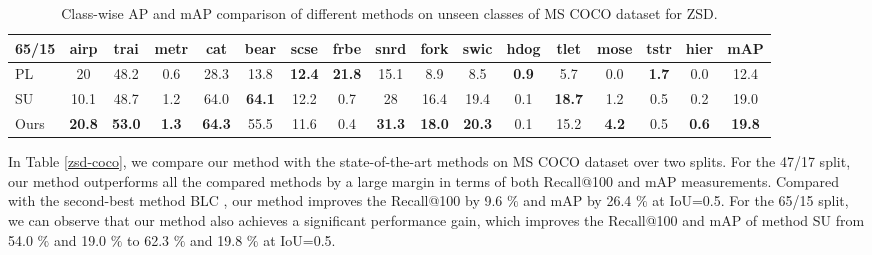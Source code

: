 \documentclass[10pt,twocolumn,letterpaper]{article}
\begin{document}
\begin{table*}[t]
  \centering

  \caption{Class-wise AP and mAP comparison of different methods on unseen classes of MS COCO dataset for ZSD.}
\renewcommand\tabcolsep{5.2pt}
    \begin{tabular}{lcccccccccccccccc}
    \toprule
    65/15 & \multicolumn{1}{c}{airp} & \multicolumn{1}{c}{trai} & \multicolumn{1}{c}{metr} & \multicolumn{1}{c}{cat} & \multicolumn{1}{c}{bear} & \multicolumn{1}{c}{scse} & \multicolumn{1}{c}{frbe} & \multicolumn{1}{c}{snrd} & \multicolumn{1}{c}{fork} & \multicolumn{1}{c}{swic} & \multicolumn{1}{c}{hdog} & \multicolumn{1}{c}{tlet} & \multicolumn{1}{c}{mose} & \multicolumn{1}{c}{tstr} & \multicolumn{1}{c}{hier} & \multicolumn{1}{c}{mAP} \\
    \midrule
    PL \cite{rahman2020improved}   & \multicolumn{1}{c}{20} & \multicolumn{1}{c}{48.2} & \multicolumn{1}{c}{0.6} & \multicolumn{1}{c}{28.3} & \multicolumn{1}{c}{13.8} & \multicolumn{1}{c}{\textbf{12.4}} & \multicolumn{1}{c}{\textbf{21.8}} & \multicolumn{1}{c}{15.1} & \multicolumn{1}{c}{8.9} & \multicolumn{1}{c}{8.5} & \multicolumn{1}{c}{\textbf{0.9}} & \multicolumn{1}{c}{5.7} & \multicolumn{1}{c}{0.0} & \multicolumn{1}{c}{\textbf{1.7}} & \multicolumn{1}{c}{0.0} & \multicolumn{1}{c}{12.4} \\
    SU  \cite{hayat2020synthesizing}  & \multicolumn{1}{c}{10.1} & \multicolumn{1}{c}{48.7} & \multicolumn{1}{c}{1.2} & \multicolumn{1}{c}{64.0} & \multicolumn{1}{c}{\textbf{64.1}} & \multicolumn{1}{c}{12.2} & \multicolumn{1}{c}{0.7} & \multicolumn{1}{c}{28} & \multicolumn{1}{c}{16.4} & \multicolumn{1}{c}{19.4} & \multicolumn{1}{c}{0.1} & \multicolumn{1}{c}{\textbf{18.7}} & \multicolumn{1}{c}{1.2} & \multicolumn{1}{c}{0.5} & \multicolumn{1}{c}{0.2} & \multicolumn{1}{c}{19.0} \\
    Ours  &\textbf{20.8}      & \textbf{53.0}     & \textbf{1.3}      & \textbf{64.3}      &55.5       & 11.6      & 0.4      & \textbf{31.3}      & \textbf{18.0}      &\textbf{20.3}       &0.1       & 15.2      &\textbf{4.2}       &0.5       &\textbf{0.6}       &\textbf{19.8}  \\
    \bottomrule
    \end{tabular}\label{clase-wise-AP-coco}\end{table*}

In Table \ref{zsd-coco}, we compare our method with the state-of-the-art methods on MS COCO dataset over two splits. For the 47/17 split, our method outperforms all the compared methods by a large margin in terms of both Recall@100 and mAP measurements. Compared with the second-best method BLC \cite{zheng2020background}, our method improves the Recall@100 by 9.6 $\%$ and mAP by 26.4 $\%$ at IoU=0.5. For the 65/15 split, we can observe that our method also achieves a significant performance gain, which improves the Recall@100 and mAP of method SU \cite{hayat2020synthesizing} from 54.0 $\%$ and 19.0 $\%$ to 62.3 $\%$ and 19.8 $\%$ at IoU=0.5.
\end{document}

